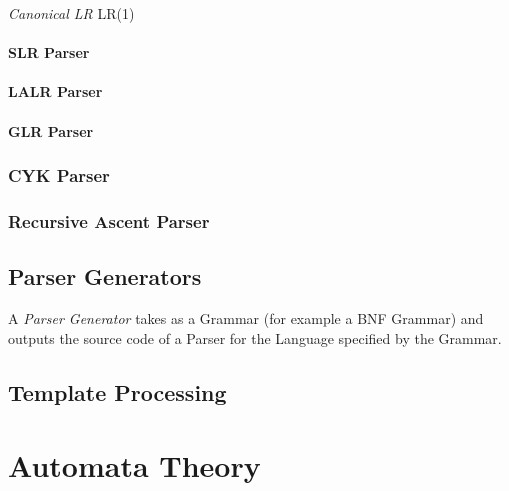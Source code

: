 \emph{Canonical LR} LR(1)

\paragraph{SLR Parser}

\paragraph{LALR Parser}

\paragraph{GLR Parser}

\subsubsection{CYK Parser}

\subsubsection{Recursive Ascent Parser}



\subsection{Parser Generators}\label{sec:parser_generator}

A \emph{Parser Generator} takes as a Grammar (for example a BNF
Grammar) and outputs the source code of a Parser for the Language
specified by the Grammar.



\subsection{Template Processing}\label{sec:template_processing}



\section{Automata Theory}\label{sec:automata_theory}

